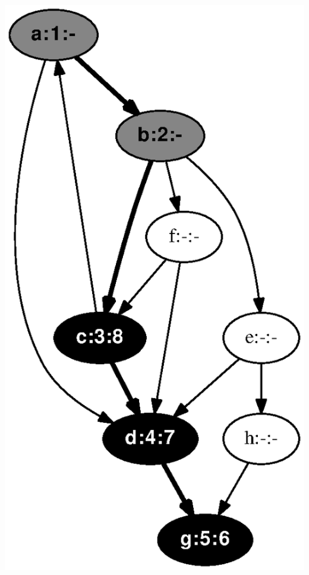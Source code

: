 \documentclass{article}
\begin{document}
\includegraphics[height=.3\textheight]{dfs_directed_classroom_08.eps}
\vspace{1em}
\end{document}
